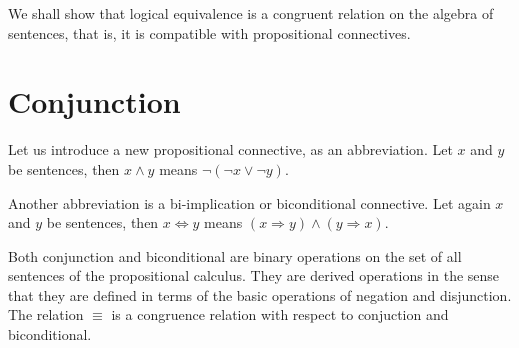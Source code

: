 \documentclass[letterpaper, 10pt]{article}
\renewcommand{\implies}{\Rightarrow}
\newcommand{\bicond}{\Leftrightarrow}
\begin{document}
We shall show that logical equivalence is a congruent relation on the algebra of
sentences, that is, it is compatible with propositional connectives.

\section{Conjunction}

Let us introduce a new propositional connective, as an abbreviation. Let $x$ and
$y$ be sentences, then $x \land y$ means $\neg(\neg x \lor \neg y)$.

Another abbreviation is a bi-implication or biconditional connective. 
Let again $x$ and $y$ be sentences, then $x \bicond y$ means $(x \implies
y)\land (y\implies x)$.

Both conjunction and biconditional are binary operations on the set of all
sentences of the propositional calculus. They are derived operations in the
sense that they are defined in terms of the basic operations of negation and
disjunction. The relation $\equiv$ is a congruence relation with respect to
conjuction and biconditional.
\end{document}
